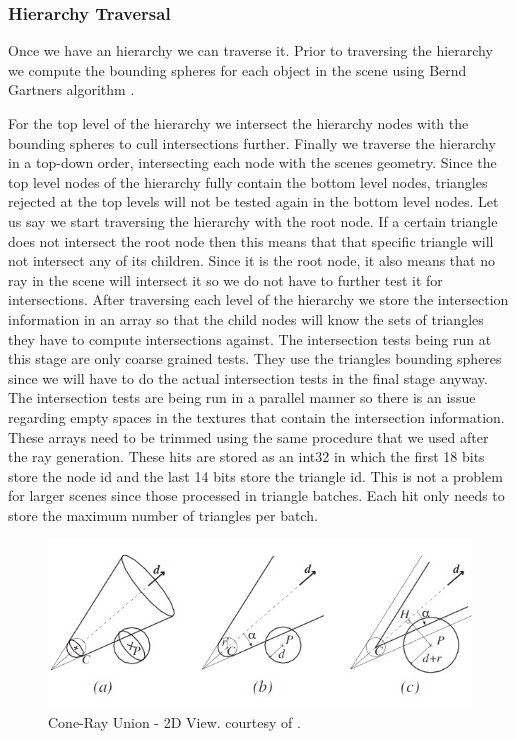 \documentclass{egpubl}
\begin{document}
\subsubsection{Hierarchy Traversal}

Once we have an hierarchy we can traverse it. Prior to traversing the hierarchy we compute the bounding spheres for each object in the scene using Bernd Gartners algorithm \cite{Gartner99}.

For the top level of the hierarchy we intersect the hierarchy nodes with the bounding spheres to cull intersections further. Finally we traverse the hierarchy in a top-down order, intersecting each node with the scenes geometry. Since the top level nodes of the hierarchy fully contain the bottom level nodes, triangles rejected at the top levels will not be tested again in the bottom level nodes. Let us say we start traversing the hierarchy with the root node. If a certain triangle does not intersect the root node then this means that that specific triangle will not intersect any of its children. Since it is the root node, it also means that no ray in the scene will intersect it so we do not have to further test it for intersections. After traversing each level of the hierarchy we store the intersection information in an array so that the child nodes will know the sets of triangles they have to compute intersections against. The intersection tests being run at this stage are only coarse grained tests. They use the triangles bounding spheres since we will have to do the actual intersection tests in the final stage anyway. The intersection tests are being run in a parallel manner so there is an issue regarding empty spaces in the textures that contain the intersection information. These arrays need to be trimmed using the same procedure that we used after the ray generation. These hits are stored as an int32 in which the first 18 bits store the node id and the last 14 bits store the triangle id. This is not a problem for larger scenes since those processed in triangle batches. Each hit only needs to store the maximum number of triangles per batch.

\begin{figure}[!htb]
    \centering
    \includegraphics[scale=0.50]{Images/Node_Sphere_Intersection.jpg}
    \caption{\label{fig:crud2}Cone-Ray Union - 2D View. \small courtesy of \cite{Roger07}.}
\end{figure}
\end{document}
